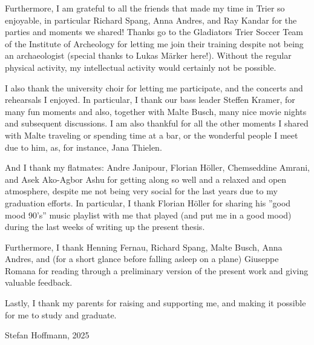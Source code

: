 
Furthermore, I am grateful to all the friends that made my time in Trier so enjoyable,
in particular Richard Spang, Anna Andres, and Ray Kandar for the parties and moments we shared!
Thanks go to the Gladiators Trier Soccer Team of the Institute of Archeology for letting me 
join their training despite not being an archaeologist  (special thanks to Lukas Märker here!). 
Without the regular physical activity, my intellectual activity would certainly not be possible.

I also thank the university choir for letting me participate, and the concerts
and rehearsals I enjoyed. In particular, I thank our bass leader Steffen Kramer, 
for many fun moments and also, together with Malte Busch, many nice movie nights and subsequent discussions. I am also thankful for all the other moments 
I shared with Malte traveling or spending time at a bar, or the wonderful
people I meet due to him, as, for instance, Jana Thielen.


And I thank my flatmates: Andre Janipour, Florian Höller, Chemseddine Amrani, and Asek Ako-Agbor Ashu
for getting along so well and a relaxed and open
atmosphere, despite me not being very social for the last years due to my graduation efforts.
In particular, I thank Florian Höller for %
sharing his 
''good mood 90's'' music playlist with me that 
played (and put me in a good mood) during the last weeks of writing up the present thesis. 

Furthermore, I thank Henning Fernau, Richard Spang, Malte Busch, Anna Andres,
and (for a short glance before falling asleep on a plane)
Giuseppe Romana for reading through a preliminary version of the present work
and giving valuable feedback.
 


Lastly, I thank my parents for raising and supporting me, and making it possible for me to study and graduate.


\begin{flushright}
	Stefan Hoffmann, 2025
\end{flushright}

